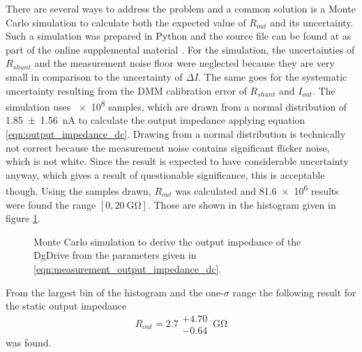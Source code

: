 There are several ways to address the problem and a common solution is a Monte Carlo simulation to calculate both the expected value of $R_{out}$ and its uncertainty. Such a simulation was prepared in Python and the source file can be found at  as part of the online supplemental material \cite{supplemental_material}. For the simulation, the uncertainties of $R_{shunt}$ and the measurement noise floor were neglected because they are very small in comparison to the uncertainty of $\Delta I$. The same goes for the systematic uncertainty resulting from the DMM calibration error of $R_{shunt}$ and $I_{out}$. The simulation uses \num{e8} samples, which are drawn from a normal distribution of \qty{1.85 \pm 1.56}{\nA} to calculate the output impedance applying equation \ref{eqn:output_impedance_dc}. Drawing from a normal distribution is technically not correct because the measurement noise contains significant flicker noise, which is not white. Since the result is expected to have considerable uncertainty anyway, which gives a result of questionable significance, this is acceptable though. Using the samples drawn, $R_{out}$ was calculated and \num{81.6e6} results were found the range $\left[0, \qty{20}{\giga \ohm}\right]$. Those are shown in the histogram given in figure \ref{fig:dgDrive_output_impedance_dc_mc}.
\begin{figure}[ht]
    \centering
    
    \caption{Monte Carlo simulation to derive the output impedance of the DgDrive from the parameters given in \ref{eqn:measurement_output_impedance_dc}.}
    \label{fig:dgDrive_output_impedance_dc_mc}
\end{figure}

From the largest bin of the histogram and the one-$\sigma$ range the following result for the static output impedance
\begin{equation*}
    R_{out} = 2.7\substack{+4.70 \\ -0.64}\,\unit{\giga\ohm}
\end{equation*}
was found.

